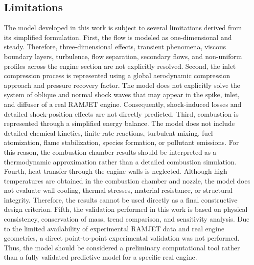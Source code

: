 \documentclass[preprint,12pt]{elsarticle}
\begin{document}
\subsection{Limitations}
The model developed in this work is subject to several limitations derived from its simplified formulation. First, the flow is modeled as one-dimensional and steady. Therefore, three-dimensional effects, transient phenomena, viscous boundary layers, turbulence, flow separation, secondary flows, and non-uniform profiles across the engine section are not explicitly resolved.
Second, the inlet compression process is represented using a global aerodynamic compression approach and pressure recovery factor. The model does not explicitly solve the system of oblique and normal shock waves that may appear in the spike, inlet, and diffuser of a real RAMJET engine. Consequently, shock-induced losses and detailed shock-position effects are not directly predicted.
Third, combustion is represented through a simplified energy balance. The model does not include detailed chemical kinetics, finite-rate reactions, turbulent mixing, fuel atomization, flame stabilization, species formation, or pollutant emissions. For this reason, the combustion chamber results should be interpreted as a thermodynamic approximation rather than a detailed combustion simulation.
Fourth, heat transfer through the engine walls is neglected. Although high temperatures are obtained in the combustion chamber and nozzle, the model does not evaluate wall cooling, thermal stresses, material resistance, or structural integrity. Therefore, the results cannot be used directly as a final constructive design criterion.
Fifth, the validation performed in this work is based on physical consistency, conservation of mass, trend comparison, and sensitivity analysis. Due to the limited availability of experimental RAMJET data and real engine geometries, a direct point-to-point experimental validation was not performed. Thus, the model should be considered a preliminary computational tool rather than a fully validated predictive model for a specific real engine.
\end{document}
